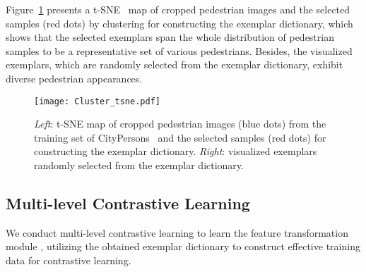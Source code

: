 \documentclass[journal]{IEEEtran}
\begin{document}
Figure~\ref{Fig:exemplar_tsne} presents a t-SNE~\cite{van2008visualizing} map of cropped pedestrian images and the selected samples (red dots) by clustering for constructing the exemplar dictionary, which shows that the selected exemplars span the whole distribution of pedestrian samples to be a representative set of various pedestrians.  Besides, the visualized exemplars, which are randomly selected from the exemplar dictionary, exhibit diverse pedestrian appearances.







\begin{figure}[!t]
\centering
    \texttt{[image: Cluster\_tsne.pdf]}
\caption{\emph{Left}: t-SNE map of cropped pedestrian images (blue dots) from the training set of CityPersons~\cite{zhang2017citypersons} and the selected samples (red dots) for constructing the exemplar dictionary. \emph{Right}: visualized exemplars randomly selected from the exemplar dictionary.}
\label{Fig:exemplar_tsne}
\end{figure}


\subsection{Multi-level Contrastive Learning}

We conduct multi-level contrastive learning to learn the feature transformation module , utilizing the obtained exemplar dictionary to construct effective training data for contrastive learning.  
\end{document}
